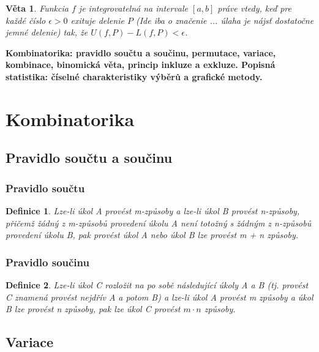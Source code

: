 \documentclass[12pt,a4paper]{article}
\newtheorem{definition}{Definice}
\newtheorem{sentence}{Věta}
\begin{document}
\begin{sentence}
	Funkcia $f$ je integrovatelná na intervale $[a, b]$ práve vtedy, keď pre každé číslo $\epsilon >0$ exituje delenie $P$ (Ide iba o značenie ... úlaha je nájsť dostatočne jemné delenie) tak, že $U(f, P)-L(f, P)< \epsilon$.
\end{sentence}

\newpage
\textbf{Kombinatorika: pravidlo součtu a součinu, permutace, variace, kombinace, binomická věta, princip inkluze a
exkluze. Popisná statistika: číselné charakteristiky výběrů a grafické metody.}

\section{Kombinatorika}
\subsection{Pravidlo součtu a součinu}
\subsubsection{Pravidlo součtu}
\begin{definition}
	Lze-li úkol A provést m-způsoby a lze-li úkol B provést n-způsoby,
přičemž žádný z m-způsobů provedení úkolu A není totožný s žádným z n-způsobů
provedení úkolu B, pak provést úkol A nebo úkol B lze provést m + n způsoby.
\end{definition}

\subsubsection{Pravidlo součinu}
\begin{definition}
	Lze-li úkol C rozložit na po sobě následující úkoly A a B (tj. provést
C znamená provést nejdřív A a potom B) a lze-li úkol A provést m způsoby a úkol B lze
provést n způsoby, pak lze úkol C provést $m \cdot n $ způsoby.	
\end{definition}

\subsection{Variace}
\end{document}
